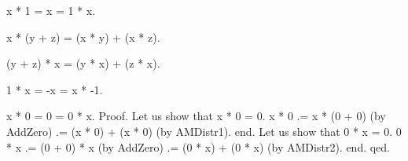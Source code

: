 \documentclass[a4paper,draft]{amsproc}
\begin{document}
\begin{forthel}
\begin{axiom}[MulUnit]
x * 1 = x = 1 * x.
\end{axiom}

\begin{axiom}[AMDistr1]
x * (y + z) = (x * y) + (x * z).
\end{axiom}

\begin{axiom}[AMDistr2]
(y + z) * x = (y * x) + (z * x).
\end{axiom}

\begin{axiom}[MulMnOne]
1 * x = -x = x * -1.
\end{axiom}

\begin{lemma}[MulZero]
x * 0 = 0 = 0 * x.
Proof.
    Let us show that x * 0 = 0.
    x * 0 .= x * (0 + 0) (by AddZero) .= (x * 0) + (x * 0) (by AMDistr1).
    end.
    Let us show that 0 * x = 0.
    0 * x .= (0 + 0) * x (by AddZero) .= (0 * x) + (0 * x) (by AMDistr2).
    end.
qed.
\end{lemma}
\end{forthel}
\end{document}
